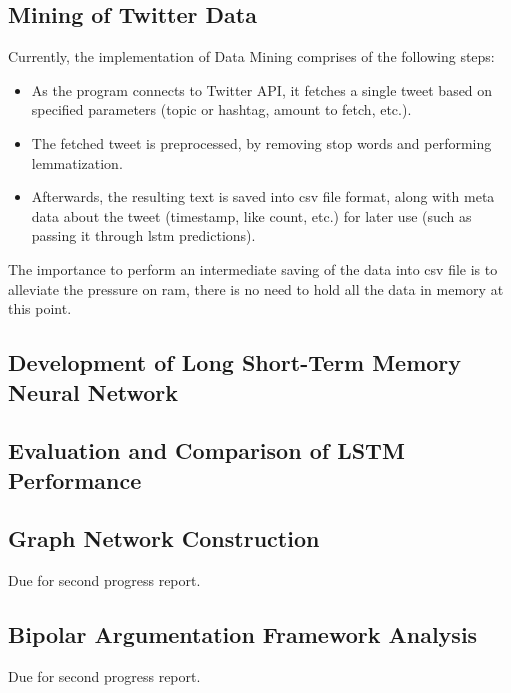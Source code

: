     \subsection{Mining of Twitter Data} \label{twitterdata}
        Currently, the implementation of Data Mining comprises of the following steps:
        \begin{itemize}
            \item As the program connects to Twitter API, it fetches a single tweet based on specified parameters (topic or hashtag, amount to fetch, etc.).
            
            \item The fetched tweet is preprocessed, by removing stop words and performing lemmatization.
            
            \item Afterwards, the resulting text is saved into \gls{csv} file format, along with meta data about the tweet (timestamp, like count, etc.) for later use (such as passing it through \gls{lstm} predictions).
        \end{itemize}
        
        The importance to perform an intermediate saving of the data into \gls{csv} file is to alleviate the pressure on \gls{ram}, there is no need to hold all the data in memory at this point.
        
    \subsection{Development of Long Short-Term Memory Neural Network} \label{devlstm}
        
    \subsection{Evaluation and Comparison of LSTM Performance}
    
    \subsection{Graph Network Construction} \label{graphnetwork}
        Due for second progress report.
    
    \subsection{Bipolar Argumentation Framework Analysis} \label{bapanalysis}
        Due for second progress report.
    
